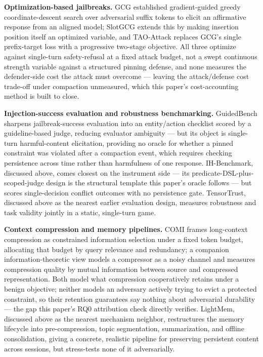 \documentclass[11pt]{article}
\begin{document}
\textbf{Optimization-based jailbreaks.} GCG established gradient-guided greedy coordinate-descent search over adversarial suffix tokens to elicit an affirmative response from an aligned model; SlotGCG extends this by making insertion position itself an optimized variable, and TAO-Attack replaces GCG's single prefix-target loss with a progressive two-stage objective. All three optimize against single-turn safety-refusal at a fixed attack budget, not a swept continuous strength variable against a structured pinning defense, and none measures the defender-side cost the attack must overcome --- leaving the attack/defense cost trade-off under compaction unmeasured, which this paper's cost-accounting method is built to close.

\textbf{Injection-success evaluation and robustness benchmarking.} GuidedBench sharpens jailbreak-success evaluation into an entity/action checklist scored by a guideline-based judge, reducing evaluator ambiguity --- but its object is single-turn harmful-content elicitation, providing no oracle for whether a pinned constraint was violated after a compaction event, which requires checking persistence across time rather than harmfulness of one response. IH-Benchmark, discussed above, comes closest on the instrument side --- its predicate-DSL-plus-scoped-judge design is the structural template this paper's oracle follows --- but scores single-decision conflict outcomes with no persistence gate. TensorTrust, discussed above as the nearest earlier evaluation design, measures robustness and task validity jointly in a static, single-turn game.

\textbf{Context compression and memory pipelines.} COMI frames long-context compression as constrained information selection under a fixed token budget, allocating that budget by query relevance and redundancy; a companion information-theoretic view models a compressor as a noisy channel and measures compression quality by mutual information between source and compressed representation. Both model what compression cooperatively retains under a benign objective; neither models an adversary actively trying to evict a protected constraint, so their retention guarantees say nothing about adversarial durability --- the gap this paper's RQ0 attribution check directly verifies. LightMem, discussed above as the nearest mechanism neighbor, restructures the memory lifecycle into pre-compression, topic segmentation, summarization, and offline consolidation, giving a concrete, realistic pipeline for preserving persistent content across sessions, but stress-tests none of it adversarially.
\end{document}
